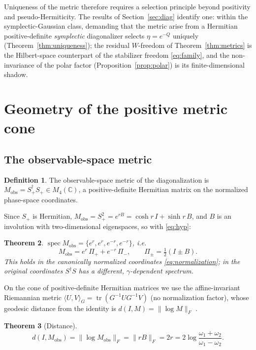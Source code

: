 \documentclass[11pt]{article}
\newtheorem{theorem}{Theorem}[section]
\theoremstyle{definition}
\newtheorem{definition}[theorem]{Definition}
\theoremstyle{remark}
\newcommand{\C}{\mathbb{C}}
\newcommand{\w}{\omega}
\newcommand{\tr}{\operatorname{tr}}
\newcommand{\Mobs}{M_{\mathrm{obs}}}
\newcommand{\dg}{\dagger}
\begin{document}
Uniqueness of the metric therefore requires a selection principle beyond
positivity and pseudo-Hermiticity.  The results of Section~\ref{sec:diag}
identify one: within the symplectic-Gaussian class, demanding that the metric
arise from a Hermitian positive-definite \emph{symplectic} diagonalizer
selects $\eta=e^{-Q}$ uniquely (Theorem~\ref{thm:uniqueness}); the residual
$W$-freedom of Theorem~\ref{thm:metrics} is the Hilbert-space counterpart of
the stabilizer freedom \eqref{eq:family}, and the non-invariance of the polar
factor (Proposition~\ref{prop:polar}) is its finite-dimensional shadow.

\section{Geometry of the positive metric cone}\label{sec:geometry}

\subsection{The observable-space metric}

\begin{definition}
The observable-space metric of the diagonalization is
$\Mobs=S_+^{\dg}S_+\in M_4(\C)$, a positive-definite Hermitian matrix on the
normalized phase-space coordinates.
\end{definition}

Since $S_+$ is Hermitian, $\Mobs=S_+^2=e^{rB}=\cosh r\,I+\sinh r\,B$, and $B$
is an involution with two-dimensional eigenspaces, so with
\eqref{eq:hyp}:

\begin{theorem}\label{thm:spectrum}
$\operatorname{spec}\Mobs=\{e^{r},e^{r},e^{-r},e^{-r}\}$, i.e.
\begin{equation}
\Mobs=e^{r}\,\Pi_++e^{-r}\,\Pi_-,
\qquad \Pi_\pm=\tfrac12(I\pm B) .
\end{equation}
This holds in the canonically normalized coordinates
\eqref{eq:normalization}; in the original coordinates $S^{\dg}S$ has a
different, $\gamma$-dependent spectrum.
\end{theorem}

On the cone of positive-definite Hermitian matrices we use the
affine-invariant Riemannian metric
$\langle U,V\rangle_G=\tr(G^{-1}UG^{-1}V)$ (no normalization factor), whose
geodesic distance from the identity is $d(I,M)=\|\log M\|_F$
\cite{Bhatia2007}.

\begin{theorem}[Distance]\label{thm:distance}
\begin{equation}
d(I,\Mobs)=\|\log \Mobs\|_F=\|rB\|_F=2r
=2\log\frac{\w_1+\w_2}{\w_1-\w_2} .
\end{equation}
\end{theorem}
\end{document}
